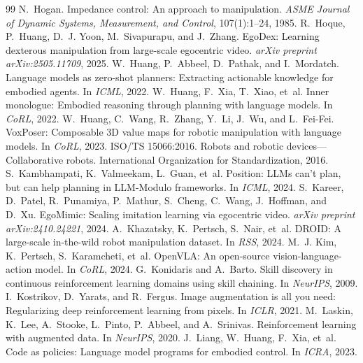 \documentclass[10pt,twocolumn,letterpaper]{article}
\begin{document}
\begin{thebibliography}{99}
 N.~Hogan. Impedance control: An approach to manipulation. \emph{ASME Journal of Dynamic Systems, Measurement, and Control}, 107(1):1--24, 1985.
 R.~Hoque, P.~Huang, D.~J. Yoon, M.~Sivapurapu, and J.~Zhang. EgoDex: Learning dexterous manipulation from large-scale egocentric video. \emph{arXiv preprint arXiv:2505.11709}, 2025.
 W.~Huang, P.~Abbeel, D.~Pathak, and I.~Mordatch. Language models as zero-shot planners: Extracting actionable knowledge for embodied agents. In \emph{ICML}, 2022.
 W.~Huang, F.~Xia, T.~Xiao, et~al. Inner monologue: Embodied reasoning through planning with language models. In \emph{CoRL}, 2022.
 W.~Huang, C.~Wang, R.~Zhang, Y.~Li, J.~Wu, and L.~Fei-Fei. VoxPoser: Composable 3D value maps for robotic manipulation with language models. In \emph{CoRL}, 2023.
 ISO/TS 15066:2016. Robots and robotic devices---Collaborative robots. International Organization for Standardization, 2016.
 S.~Kambhampati, K.~Valmeekam, L.~Guan, et~al. Position: LLMs can't plan, but can help planning in LLM-Modulo frameworks. In \emph{ICML}, 2024.
 S.~Kareer, D.~Patel, R.~Punamiya, P.~Mathur, S.~Cheng, C.~Wang, J.~Hoffman, and D.~Xu. EgoMimic: Scaling imitation learning via egocentric video. \emph{arXiv preprint arXiv:2410.24221}, 2024.
 A.~Khazatsky, K.~Pertsch, S.~Nair, et~al. DROID: A large-scale in-the-wild robot manipulation dataset. In \emph{RSS}, 2024.
 M.~J. Kim, K.~Pertsch, S.~Karamcheti, et~al. OpenVLA: An open-source vision-language-action model. In \emph{CoRL}, 2024.
 G.~Konidaris and A.~Barto. Skill discovery in continuous reinforcement learning domains using skill chaining. In \emph{NeurIPS}, 2009.
 I.~Kostrikov, D.~Yarats, and R.~Fergus. Image augmentation is all you need: Regularizing deep reinforcement learning from pixels. In \emph{ICLR}, 2021.
 M.~Laskin, K.~Lee, A.~Stooke, L.~Pinto, P.~Abbeel, and A.~Srinivas. Reinforcement learning with augmented data. In \emph{NeurIPS}, 2020.
 J.~Liang, W.~Huang, F.~Xia, et~al. Code as policies: Language model programs for embodied control. In \emph{ICRA}, 2023.

\end{thebibliography}
\end{document}

